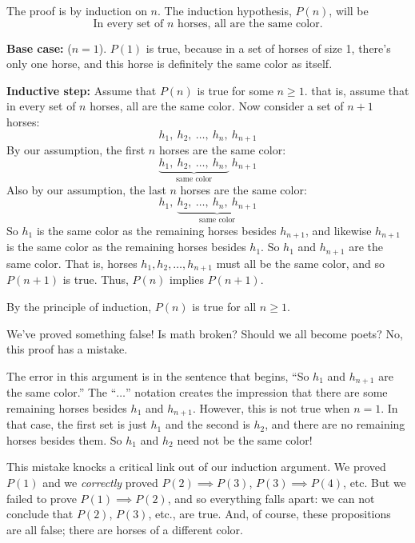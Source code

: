\begin{falseproof}

The proof is by induction on $n$.  The induction hypothesis, $P(n)$, will be
\begin{equation}\label{horsehyp}
\text{In every set of $n$ horses, all are the same color.}
\end{equation}

\textbf{Base case:} ($n=1$).  $P(1)$ is true, because in a set of horses
of size 1, there's only one horse, and this horse is definitely the same
color as itself.

\textbf{Inductive step:} Assume that $P(n)$ is true for some $n \geq 1$.
that is, assume that in every set of $n$ horses, all are the same color.
Now consider a set of $n+1$ horses:
%
\[
h_1,\ h_2,\ \dots,\ h_n,\ h_{n+1}
\]
%
By our assumption, the first $n$ horses are the same color:
%
\[
\underbrace{h_1,\ h_2,\ \dots,\ h_n,}_{\text{same color}}\ h_{n+1}
\]
%
Also by our assumption, the last $n$ horses are the same color:
%
\[
h_1,\ \underbrace{h_2,\ \dots,\ h_n,\ h_{n+1}}_{\text{same color}}
\]
%
So $h_1$ is the same color as the remaining horses besides $h_{n+1}$, and
likewise $h_{n+1}$ is the same color as the remaining horses besides
$h_1$.  So $h_1$ and $h_{n+1}$ are the same color.  That is, horses $h_1,
h_2, \dots, h_{n+1}$ must all be the same color, and so $P(n+1)$ is true.
Thus, $P(n)$ implies $P(n+1)$.

By the principle of induction, $P(n)$ is true for all $n \geq 1$.
\end{falseproof}
We've proved something false!  Is math broken?  Should we all become
poets?  No, this proof has a mistake.


The error in this argument is in the sentence that begins, ``So $h_1$ and
$h_{n+1}$ are the same color.''  The ``$\dots$'' notation creates the
impression that there are some remaining horses besides $h_1$ and
$h_{n+1}$.  However, this is not true when $n = 1$.  In that case, the
first set is just $h_1$ and the second is $h_2$, and there are no
remaining horses besides them.  So $h_1$ and $h_2$ need not be the same
color!

This mistake knocks a critical link out of our induction argument.  We
proved $P(1)$ and we \emph{correctly} proved $P(2) \implies P(3)$, $P(3)
\implies P(4)$, etc.  But we failed to prove $P(1) \implies P(2)$, and so
everything falls apart: we can not conclude that $P(2)$, $P(3)$, etc., are
true.  And, of course, these propositions are all false; there are horses
of a different color.

